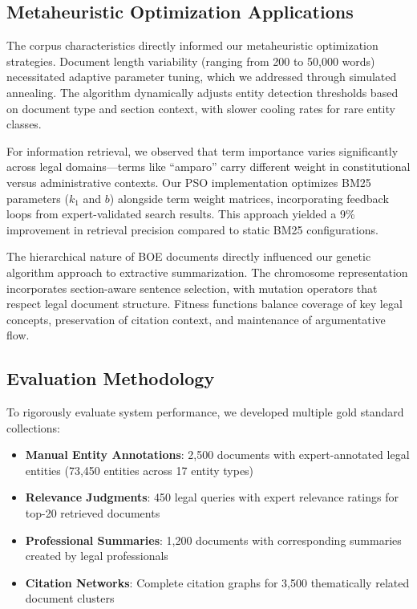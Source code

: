 \documentclass[conference]{IEEEtran}
\begin{document}
\subsection{Metaheuristic Optimization Applications}
The corpus characteristics directly informed our metaheuristic optimization strategies. Document length variability (ranging from 200 to 50,000 words) necessitated adaptive parameter tuning, which we addressed through simulated annealing. The algorithm dynamically adjusts entity detection thresholds based on document type and section context, with slower cooling rates for rare entity classes.

For information retrieval, we observed that term importance varies significantly across legal domains—terms like ``amparo'' carry different weight in constitutional versus administrative contexts. Our PSO implementation optimizes BM25 parameters ($k_1$ and $b$) alongside term weight matrices, incorporating feedback loops from expert-validated search results. This approach yielded a 9\% improvement in retrieval precision compared to static BM25 configurations.

The hierarchical nature of BOE documents directly influenced our genetic algorithm approach to extractive summarization. The chromosome representation incorporates section-aware sentence selection, with mutation operators that respect legal document structure. Fitness functions balance coverage of key legal concepts, preservation of citation context, and maintenance of argumentative flow.

\subsection{Evaluation Methodology}
To rigorously evaluate system performance, we developed multiple gold standard collections:

\begin{itemize}
    \item \textbf{Manual Entity Annotations}: 2,500 documents with expert-annotated legal entities (73,450 entities across 17 entity types)
    \item \textbf{Relevance Judgments}: 450 legal queries with expert relevance ratings for top-20 retrieved documents
    \item \textbf{Professional Summaries}: 1,200 documents with corresponding summaries created by legal professionals
    \item \textbf{Citation Networks}: Complete citation graphs for 3,500 thematically related document clusters
\end{itemize}
\end{document}
